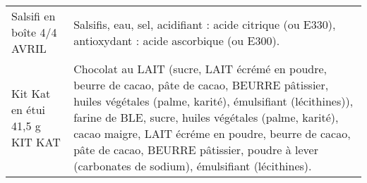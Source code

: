 \begin{longtable}{p{5cm}p{10cm}}
                                                                               Salsifi en boîte 4/4 AVRIL &                                                                                                                                                                                                                                                                                                                                                                                                                                                                                                                                                                                                                                                                                                                                                                                                                                                                                                                                     Salsifis, eau, sel, acidifiant : acide citrique (ou E330), antioxydant : acide ascorbique (ou E300). \\
                                                                           Kit Kat en étui 41,5 g KIT KAT &                                                                                                                                                                                                                                                                                                                                                                                                                                                                                                                                                                                                                                                           Chocolat au LAIT (sucre, LAIT écrémé en poudre, beurre de cacao, pâte de cacao, BEURRE pâtissier, huiles végétales (palme, karité), émulsifiant (lécithines)), farine de BLE, sucre, huiles végétales (palme, karité), cacao maigre, LAIT écréme en poudre, beurre de cacao, pâte de cacao, BEURRE pâtissier, poudre à lever (carbonates de sodium), émulsifiant (lécithines). \\

\end{longtable}
